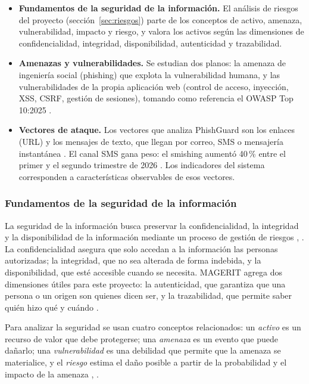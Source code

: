 \documentclass[journal,onecolumn,12pt,draftclsnofoot]{IEEEtran}
\begin{document}
\begin{itemize}
  \item \textbf{Fundamentos de la seguridad de la información.} El análisis de riesgos del proyecto (sección~\ref{sec:riesgos}) parte de los conceptos de activo, amenaza, vulnerabilidad, impacto y riesgo, y valora los activos según las dimensiones de confidencialidad, integridad, disponibilidad, autenticidad y trazabilidad.
  \item \textbf{Amenazas y vulnerabilidades.} Se estudian dos planos: la amenaza de ingeniería social (phishing) que explota la vulnerabilidad humana, y las vulnerabilidades de la propia aplicación web (control de acceso, inyección, XSS, CSRF, gestión de sesiones), tomando como referencia el OWASP Top 10:2025 \cite{owasp}.
  \item \textbf{Vectores de ataque.} Los vectores que analiza PhishGuard son los enlaces (URL) y los mensajes de texto, que llegan por correo, SMS o mensajería instantánea \cite{yeboah}. El canal SMS gana peso: el smishing aumentó 40\,\% entre el primer y el segundo trimestre de 2026 \cite{apwg-q2}. Los indicadores del sistema corresponden a características observables de esos vectores.
\end{itemize}

\subsubsection{Fundamentos de la seguridad de la información}

La seguridad de la información busca preservar la confidencialidad, la integridad y la disponibilidad de la información mediante un proceso de gestión de riesgos \cite{aceituno}, \cite{iso27001}. La confidencialidad asegura que solo accedan a la información las personas autorizadas; la integridad, que no sea alterada de forma indebida, y la disponibilidad, que esté accesible cuando se necesita. MAGERIT agrega dos dimensiones útiles para este proyecto: la autenticidad, que garantiza que una persona o un origen son quienes dicen ser, y la trazabilidad, que permite saber quién hizo qué y cuándo \cite{magerit}.

Para analizar la seguridad se usan cuatro conceptos relacionados: un \emph{activo} es un recurso de valor que debe protegerse; una \emph{amenaza} es un evento que puede dañarlo; una \emph{vulnerabilidad} es una debilidad que permite que la amenaza se materialice, y el \emph{riesgo} estima el daño posible a partir de la probabilidad y el impacto de la amenaza \cite{aceituno}, \cite{magerit}.
\end{document}
